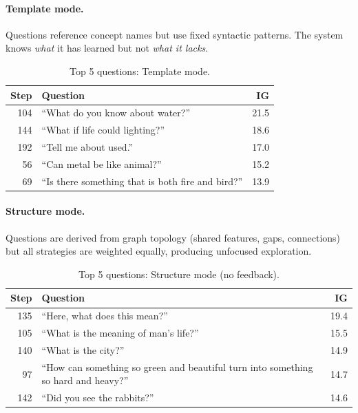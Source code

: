 \documentclass[conference]{IEEEtran}
\begin{document}
\paragraph{Template mode.} Questions reference concept names but use fixed syntactic patterns. The system knows \emph{what} it has learned but not \emph{what it lacks}.

\begin{table}[!htbp]
\centering
\caption{Top 5 questions: Template mode.}
\begin{tabular}{rp{4.5cm}r}
\toprule
\textbf{Step} & \textbf{Question} & \textbf{IG} \\
\midrule
104 & ``What do you know about water?'' & 21.5 \\
144 & ``What if life could lighting?'' & 18.6 \\
192 & ``Tell me about used.'' & 17.0 \\
56  & ``Can metal be like animal?'' & 15.2 \\
69  & ``Is there something that is both fire and bird?'' & 13.9 \\
\bottomrule
\end{tabular}
\end{table}

\paragraph{Structure mode.} Questions are derived from graph topology (shared features, gaps, connections) but all strategies are weighted equally, producing unfocused exploration.

\begin{table}[!htbp]
\centering
\caption{Top 5 questions: Structure mode (no feedback).}
\begin{tabular}{rp{4.5cm}r}
\toprule
\textbf{Step} & \textbf{Question} & \textbf{IG} \\
\midrule
135 & ``Here, what does this mean?'' & 19.4 \\
105 & ``What is the meaning of man's life?'' & 15.5 \\
140 & ``What is the city?'' & 14.9 \\
97  & ``How can something so green and beautiful turn into something so hard and heavy?'' & 14.7 \\
142 & ``Did you see the rabbits?'' & 14.6 \\
\bottomrule
\end{tabular}
\end{table}
\end{document}
